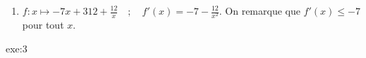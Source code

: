 {\begin{enumerate}
\begin{align*}
& \iff -10x^2 + 360 = 0 \\
& \iff x^2 = 36 \\
& \iff x=-6 \text{~ou~} x=6 
\end{align*}
On remarque que $f'(1)=-10+360>0$.
\begin{center}
\end{center}
\item $f:x \mapsto -7x + 312 + \frac{12}{x} \quad ; \quad f'(x) = -7 - \frac{12}{x^2}$. \newline
On remarque que $f'(x) \leq -7$ pour tout $x$.
\begin{center}
\end{center}
\end{enumerate}
}{exe:3}{

}

